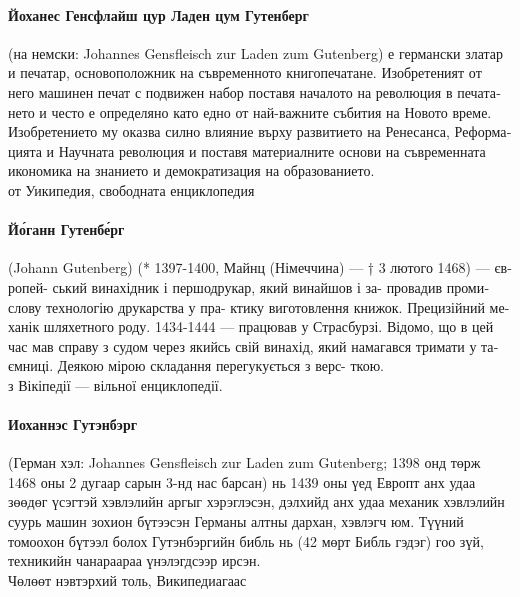 \documentclass[pagesize,DIV14]{scrartcl}
\begin{document}
\begin{multicols}{2}
\begin{bulgarian}
\paragraph*{Йоханес Генсфлайш цур Ладен цум Гутенберг} (на немски: Johannes Gensfleisch zur Laden zum Gutenberg) е германски златар и печатар, основоположник на съвременното книгопечатане. Изобретеният от него машинен печат с подвижен набор поставя началото на революция в печатането и често е определяно като едно от най-важните събития на Новото време. Изобретението му оказва силно влияние върху развитието на Ренесанса, Реформацията и Научната революция и поставя материалните основи на съвременната икономика на знанието и демократизация на образованието.\\
{\scriptsize от Уикипедия, свободната енциклопедия}
\end{bulgarian}

\begin{ukrainian}
\paragraph*{Йо́ганн Гутенбе́рг} (Johann Gutenberg) (* 1397-1400,
Майнц (Німеччина) — † 3 лютого 1468) — європей-
ський винахідник і першодрукар, який винайшов і за-
провадив промислову технологію друкарства у пра-
ктику виготовлення книжок.
Прецизійний механік шляхетного роду.
1434-1444 — працював у Страсбурзі. Відомо, що в
цей час мав справу з судом через якийсь свій винахід,
який намагався тримати у таємниці.
Деякою мірою складання перегукується з верс-
ткою.\\
{\scriptsize з Вікіпедії — вільної енциклопедії.}
\end{ukrainian}

\paragraph*{Иоханнэс Гутэнбэрг} (Герман хэл: Johannes Gensfleisch
zur Laden zum Gutenberg; 1398 онд төрж 1468
оны 2 дугаар сарын 3-нд нас барсан) нь 1439 оны
үед Европт анх удаа зөөдөг үсэгтэй хэвлэлийн аргыг
хэрэглэсэн, дэлхийд анх удаа механик хэвлэлийн
суурь машин зохион бүтээсэн Германы алтны
дархан, хэвлэгч юм. Түүний томоохон бүтээл болох
Гутэнбэргийн библь нь (42 мөрт Библь гэдэг) гоо зүй,
техникийн чанараараа үнэлэгдсээр ирсэн.\\
{\scriptsize Чөлөөт нэвтэрхий толь, Википедиагаас}


\end{multicols}
\end{document}
